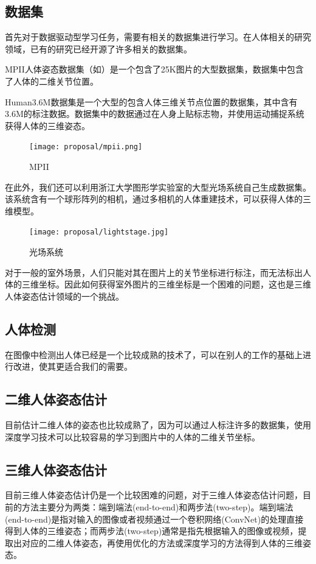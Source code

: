 \subsection{数据集}
首先对于数据驱动型学习任务，需要有相关的数据集进行学习。在人体相关的研究领域，已有的研究已经开源了许多相关的数据集。

MPII\cite{andriluka14cvpr}人体姿态数据集（如）是一个包含了25K图片的大型数据集，数据集中包含了人体的二维关节位置。

Human3.6M\cite{ionescu2014human}数据集是一个大型的包含人体三维关节点位置的数据集，其中含有3.6M的标注数据。数据集中的数据通过在人身上贴标志物，并使用运动捕捉系统获得人体的三维姿态。

\begin{figure}[ht]
    \centering
    \texttt{[image: proposal/mpii.png]}
    \caption{\label{fig:mpii}MPII}
\end{figure}

在此外，我们还可以利用浙江大学图形学实验室的大型光场系统自己生成数据集。该系统含有一个球形阵列的相机，通过多相机的人体重建技术，可以获得人体的三维模型。

\begin{figure}[ht]
    \centering
    \texttt{[image: proposal/lightstage.jpg]}
    \caption{\label{fig:light}光场系统}
\end{figure}

对于一般的室外场景，人们只能对其在图片上的关节坐标进行标注，而无法标出人体的三维坐标。因此如何获得室外图片的三维坐标是一个困难的问题，这也是三维人体姿态估计领域的一个挑战。
\subsection{人体检测}
在图像中检测出人体已经是一个比较成熟的技术了，可以在别人的工作的基础上进行改进，使其更适合我们的需要。

\subsection{二维人体姿态估计}
目前估计二维人体的姿态也比较成熟了，因为可以通过人标注许多的数据集，使用深度学习技术可以比较容易的学习到图片中的人体的二维关节坐标。

\subsection{三维人体姿态估计}
目前三维人体姿态估计仍是一个比较困难的问题，对于三维人体姿态估计问题，目前的方法主要分为两类：端到端法(end-to-end)\autocite{pavlakos2017coarse}和两步法(two-step)\autocite{zhou2016sparseness}。端到端法(end-to-end)\autocite{pavlakos2017coarse}是指对输入的图像或者视频通过一个卷积网络(ConvNet)的处理直接得到人体的三维姿态；而两步法(two-step)\autocite{zhou2016sparseness}通常是指先根据输入的图像或视频，提取出对应的二维人体姿态，再使用优化的方法或深度学习的方法得到人体的三维姿态。

